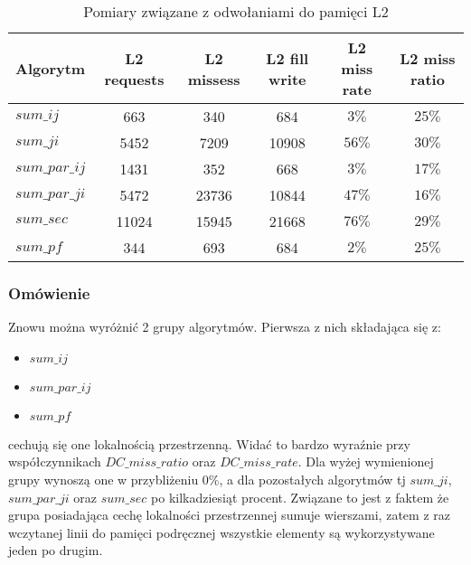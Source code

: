 \begin{table}[H]
\caption{Pomiary związane z odwołaniami do pamięci L2}

\begin{tabular}{|l|c|c|c|c|c|}

\hline
  Algorytm &
  L2 requests &
  L2 missess &
  L2 fill write &
  L2 miss rate &
  L2 miss ratio \\

\hline
  $sum\_ij$ &
  663 &
  340 &
  684 &
  $3\%$ &
  $25\%$ \\

\hline
  $sum\_ji$ &
  5452 &
  7209 &
  10908 &
  $56\%$ &
  $30\%$ \\

\hline
  $sum\_par\_ij$ &
  1431 &
  352 &
  668 &
  $3\%$ &
  $17\%$ \\

\hline
  $sum\_par\_ji$ &
  5472 &
  23736 &
  10844 &
  $47\%$ &
  $16\%$ \\

\hline
  $sum\_sec$ &
  11024 &
  15945 &
  21668 &
  $76\%$ &
  $29\%$ \\

\hline
  $sum\_pf$ &
  344 &
  693 &
  684 &
  $2\%$ &
  $25\%$ \\

\hline

\end{tabular}

\end{table}

\subsubsection{Omówienie}

Znowu można wyróżnić 2 grupy algorytmów. Pierwsza z nich składająca się z:

\begin{itemize}
\item $sum\_ij$
\item $sum\_par\_ij$
\item $sum\_pf$
\end{itemize}

cechują się one lokalnością przestrzenną. Widać to bardzo wyraźnie przy współczynnikach $DC\_miss\_ratio$ oraz $DC\_miss\_rate$. Dla wyżej wymienionej grupy wynoszą one w przybliżeniu $0\%$, a dla pozostałych algorytmów tj $sum\_ji$, $sum\_par\_ji$ oraz $sum\_sec$ po kilkadziesiąt procent. Związane to jest z faktem że grupa posiadająca cechę lokalności przestrzennej sumuje wierszami, zatem z raz wczytanej linii do pamięci podręcznej wszystkie elementy są wykorzystywane jeden po drugim.
